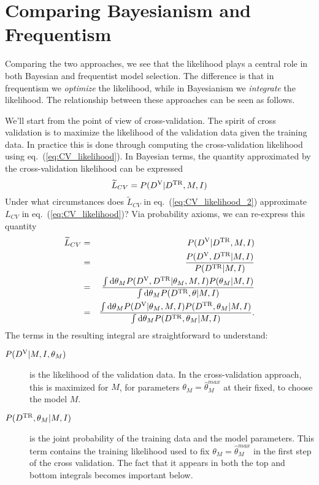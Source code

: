 \documentclass[12pt]{article}
\newcommand{\dd}{\mathrm{d}}
\newcommand{\Dtr}{\ensuremath{D^{\rm TR}}}
\newcommand{\Dva}{\ensuremath{D^{\rm V}}}
\newcommand{\eqn}[1]{eq.~(\ref{eq:#1})}
\begin{document}
\section{Comparing Bayesianism and Frequentism}
Comparing the two approaches, we see that the likelihood plays a central
role in both Bayesian and frequentist model selection.  The difference
is that in frequentism we {\it optimize} the likelihood, while in
Bayesianism we {\it integrate} the likelihood.  The relationship between
these approaches can be seen as follows.

We'll start from the point of view of cross-validation.  The spirit of cross
validation is to maximize the likelihood of the validation data given the
training data.  In practice this is done through computing the cross-validation
likelihood using \eqn{CV_likelihood}.  In Bayesian terms, the quantity
approximated by the cross-validation likelihood can be expressed
\begin{equation}
  \label{eq:CV_likelihood_2}
  \widetilde{L}_{CV} = P(\Dva|\Dtr,M,I)
\end{equation}
Under what circumstances does $\widetilde{L}_{CV}$ in \eqn{CV_likelihood_2}
approximate ${L}_{CV}$ in \eqn{CV_likelihood}?  Via probability axioms,
we can re-express this quantity
\begin{eqnarray}
  \label{eq:LCV_derivation}
  \widetilde{L}_{CV} &=& P(\Dva|\Dtr,M,I)\nonumber\\
                    &=& \frac{P(\Dva, \Dtr|M,I)}{P(\Dtr|M,I)}\nonumber\\
                    &=& \frac{\int \dd\theta_M P(\Dva, \Dtr|\theta_M,M,I)
                                               P(\theta_M|M,I)}
                             {\int \dd\theta_M P(\Dtr, \theta|M,I)}\nonumber\\
                    &=& \frac{\int \dd\theta_M P(\Dva|\theta_M,M,I)
                                               P(\Dtr, \theta_M|M,I)}
                             {\int \dd\theta_M P(\Dtr, \theta_M|M,I)}.
\end{eqnarray}
The terms in the resulting integral are straightforward to understand:
\begin{description}
  \item[$P(\Dva|M, I, \theta_M)$] is the likelihood of the validation
    data.  In the cross-validation approach, this is maximized for $M$,
    for parameters $\theta_M = \hat{\theta}^{max}_M$ at their fixed, to choose
    the model $M$.
  \item[$P(\Dtr,\theta_M|M, I)$] is the joint probability of the training data
    and the model parameters.  This term contains the training likelihood used
    to fix  $\theta_M = \hat{\theta}^{max}_M$ in the first step of the cross
    validation.  The fact that it appears in both the top and bottom integrals
    becomes important below.
\end{description}
\end{document}
